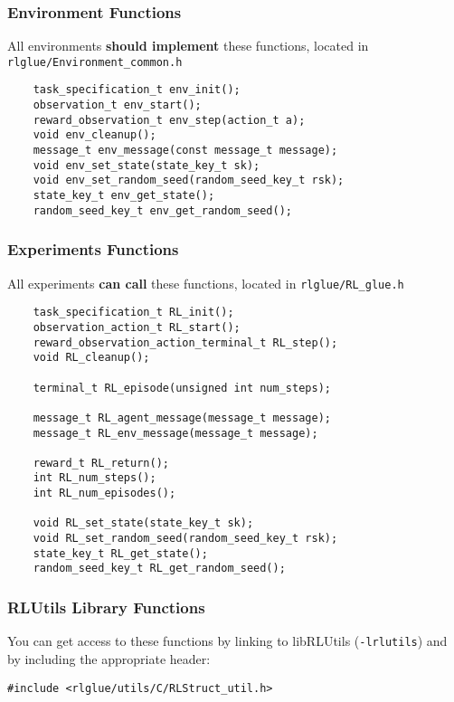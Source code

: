\documentclass[11pt]{article}
\begin{document}
\subsubsection{Environment Functions}
All environments \textbf{should implement} these functions, located in \texttt{rlglue/Environment\_common.h}
\begin{verbatim}
    task_specification_t env_init();
    observation_t env_start();
    reward_observation_t env_step(action_t a);
    void env_cleanup();
    message_t env_message(const message_t message);
    void env_set_state(state_key_t sk);
    void env_set_random_seed(random_seed_key_t rsk);
    state_key_t env_get_state();
    random_seed_key_t env_get_random_seed();
\end{verbatim}

\subsubsection{Experiments Functions}
All experiments \textbf{can call} these functions, located in \texttt{rlglue/RL\_glue.h}
\begin{verbatim}
    task_specification_t RL_init();
    observation_action_t RL_start();
    reward_observation_action_terminal_t RL_step();
    void RL_cleanup();

    terminal_t RL_episode(unsigned int num_steps);

    message_t RL_agent_message(message_t message);
    message_t RL_env_message(message_t message);

    reward_t RL_return();
    int RL_num_steps();
    int RL_num_episodes();

    void RL_set_state(state_key_t sk);
    void RL_set_random_seed(random_seed_key_t rsk);
    state_key_t RL_get_state();
    random_seed_key_t RL_get_random_seed();
\end{verbatim}

\subsubsection{RLUtils Library Functions}
\label{sec:util-functions}
You can get access to these functions by linking to libRLUtils (\texttt{-lrlutils}) and by including the appropriate header:

\begin{verbatim}
#include <rlglue/utils/C/RLStruct_util.h>
\end{verbatim}
\end{document}
